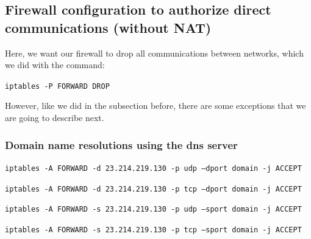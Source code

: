 \documentclass{article}
\begin{document}
\subsection{Firewall configuration to authorize direct communications (without NAT)}

\quad Here, we want our firewall to drop all communications between networks, which we did with the command:\par
\texttt{}\par
\texttt{iptables -P FORWARD DROP}\par
\texttt{}\par

However, like we did in the subsection before, there are some exceptions that we are going to describe next.

\subsubsection{Domain name resolutions using the dns server}

\texttt{}\par
\texttt{iptables -A FORWARD -d 23.214.219.130 -p udp --dport domain -j ACCEPT}\par
\texttt{iptables -A FORWARD -d 23.214.219.130 -p tcp --dport domain -j ACCEPT}\par
\texttt{iptables -A FORWARD -s 23.214.219.130 -p udp --sport domain -j ACCEPT}\par
\texttt{iptables -A FORWARD -s 23.214.219.130 -p tcp --sport domain -j ACCEPT}\par
\texttt{}\par
\end{document}

